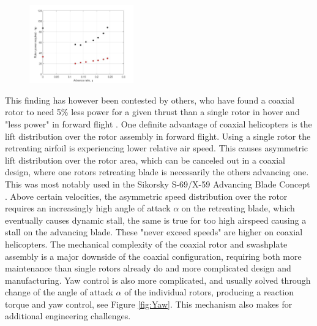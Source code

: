 \documentclass[11pt, a4paper]{scrartcl}
\begin{document}
\begin{figure}
    {\includegraphics[width=0.4\textwidth]{Plot.jpg}}
\end{figure}

This finding has however been contested by others, who have found a coaxial rotor to need 5\% less power for a given thrust than a single rotor in hover and "less power" in forward flight \cite{Coleman-1997}.
One definite advantage of coaxial helicopters is the lift distribution over the rotor assembly in forward flight. Using a single rotor the retreating airfoil is experiencing lower relative air speed. This causes asymmetric lift distribution over the rotor area, which can be canceled out in a coaxial design, where one rotors retreating blade is necessarily the others advancing one. This was most notably used in the \hypertarget{Sikorsky}{Sikorsky S-69/X-59 Advancing Blade Concept} \cite{Coleman-1997}. Above certain velocities, the asymmetric speed distribution over the rotor requires an increasingly high angle of attack $\alpha$ on the retreating blade, which eventually causes dynamic stall, the same is true for too high airspeed causing a stall on the advancing blade. These "never exceed speeds" are higher on coaxial helicopters.
The mechanical complexity of the coaxial rotor and swashplate assembly is a major downside of the coaxial configuration, requiring both more maintenance than single rotors already do and more complicated design and manufacturing. 
\newpage
Yaw control is also more complicated, and usually solved through change of the angle of attack $\alpha$ of the individual rotors, producing a reaction torque and yaw control, see Figure \ref{fig:Yaw}. This mechanism also makes for additional engineering challenges.
\end{document}
